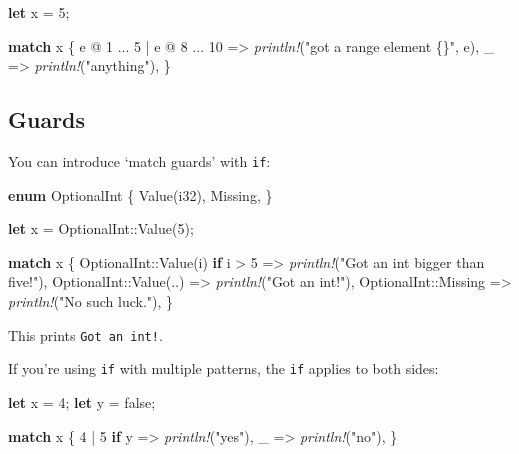 \documentclass[a4paper,]{book}
\newenvironment{Shaded}{\begin{snugshade}}{\end{snugshade}}
\newcommand{\KeywordTok}[1]{\textcolor[rgb]{0.13,0.29,0.53}{\textbf{{#1}}}}
\newcommand{\DataTypeTok}[1]{\textcolor[rgb]{0.13,0.29,0.53}{{#1}}}
\newcommand{\DecValTok}[1]{\textcolor[rgb]{0.00,0.00,0.81}{{#1}}}
\newcommand{\ConstantTok}[1]{\textcolor[rgb]{0.00,0.00,0.00}{{#1}}}
\newcommand{\StringTok}[1]{\textcolor[rgb]{0.31,0.60,0.02}{{#1}}}
\newcommand{\PreprocessorTok}[1]{\textcolor[rgb]{0.56,0.35,0.01}{\textit{{#1}}}}
\newcommand{\NormalTok}[1]{{#1}}
\begin{document}
\begin{Shaded}
\begin{Highlighting}[]
\KeywordTok{let} \NormalTok{x = }\DecValTok{5}\NormalTok{;}

\KeywordTok{match} \NormalTok{x \{}
    \NormalTok{e @ }\DecValTok{1} \NormalTok{... }\DecValTok{5} \NormalTok{| e @ }\DecValTok{8} \NormalTok{... }\DecValTok{10} \NormalTok{=> }\PreprocessorTok{println!}\NormalTok{(}\StringTok{"got a range element \{\}"}\NormalTok{, e),}
    \NormalTok{_ => }\PreprocessorTok{println!}\NormalTok{(}\StringTok{"anything"}\NormalTok{),}
\NormalTok{\}}
\end{Highlighting}
\end{Shaded}

\subsection{Guards}\label{guards}

You can introduce `match guards' with \texttt{if}:

\begin{Shaded}
\begin{Highlighting}[]
\KeywordTok{enum} \NormalTok{OptionalInt \{}
    \NormalTok{Value(}\DataTypeTok{i32}\NormalTok{),}
    \NormalTok{Missing,}
\NormalTok{\}}

\KeywordTok{let} \NormalTok{x = OptionalInt::Value(}\DecValTok{5}\NormalTok{);}

\KeywordTok{match} \NormalTok{x \{}
    \NormalTok{OptionalInt::Value(i) }\KeywordTok{if} \NormalTok{i > }\DecValTok{5} \NormalTok{=> }\PreprocessorTok{println!}\NormalTok{(}\StringTok{"Got an int bigger than five!"}\NormalTok{),}
    \NormalTok{OptionalInt::Value(..) => }\PreprocessorTok{println!}\NormalTok{(}\StringTok{"Got an int!"}\NormalTok{),}
    \NormalTok{OptionalInt::Missing => }\PreprocessorTok{println!}\NormalTok{(}\StringTok{"No such luck."}\NormalTok{),}
\NormalTok{\}}
\end{Highlighting}
\end{Shaded}

This prints \texttt{Got\ an\ int!}.

If you're using \texttt{if} with multiple patterns, the \texttt{if}
applies to both sides:

\begin{Shaded}
\begin{Highlighting}[]
\KeywordTok{let} \NormalTok{x = }\DecValTok{4}\NormalTok{;}
\KeywordTok{let} \NormalTok{y = }\ConstantTok{false}\NormalTok{;}

\KeywordTok{match} \NormalTok{x \{}
    \DecValTok{4} \NormalTok{| }\DecValTok{5} \KeywordTok{if} \NormalTok{y => }\PreprocessorTok{println!}\NormalTok{(}\StringTok{"yes"}\NormalTok{),}
    \NormalTok{_ => }\PreprocessorTok{println!}\NormalTok{(}\StringTok{"no"}\NormalTok{),}
\NormalTok{\}}
\end{Highlighting}
\end{Shaded}
\end{document}
